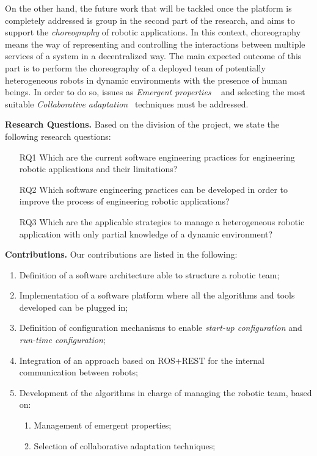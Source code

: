 On the other hand, the future work that will be tackled once the platform is completely addressed is group in the second part of the research, and aims to support the \emph{choreography} of robotic applications.
In this context, choreography means the way of representing and controlling the interactions between multiple services of a system in a decentralized way.
The main expected outcome of this part is to perform the choreography of a deployed team of potentially heterogeneous robots in dynamic environments with the presence of human beings.
In order to do so, issues as \emph{Emergent properties} ~\cite{DeAngelis2015,DeAngelis2016} and selecting the most suitable \emph{Collaborative adaptation}~\cite{Yan2013} techniques must be addressed.

\textbf{Research Questions.} 
Based on the division of the project, we state the following research questions:
\begin{itemize}
\item[RQ1] Which are the current software engineering practices for engineering robotic applications and their limitations?
\item[RQ2] Which software engineering practices can be developed in order to improve the process of engineering robotic applications?
\item[RQ3] Which are the applicable strategies to manage a heterogeneous robotic application with only partial knowledge of a dynamic environment?
\end{itemize}

\textbf{Contributions.} 
Our contributions are listed in the following:

\begin{enumerate}
\item Definition of a software architecture able to structure a robotic team;
\item Implementation of a software platform where all the algorithms and tools developed can be plugged in;
\item Definition of configuration mechanisms to enable \emph{start-up configuration} and \emph{run-time configuration};
\item Integration of an approach based on ROS+REST for the internal communication between robots;
\item Development of the algorithms in charge of managing the robotic team, based on:
\begin{enumerate}
\item Management of emergent properties;
\item Selection of collaborative adaptation techniques;
\end{enumerate}
\end{enumerate}


